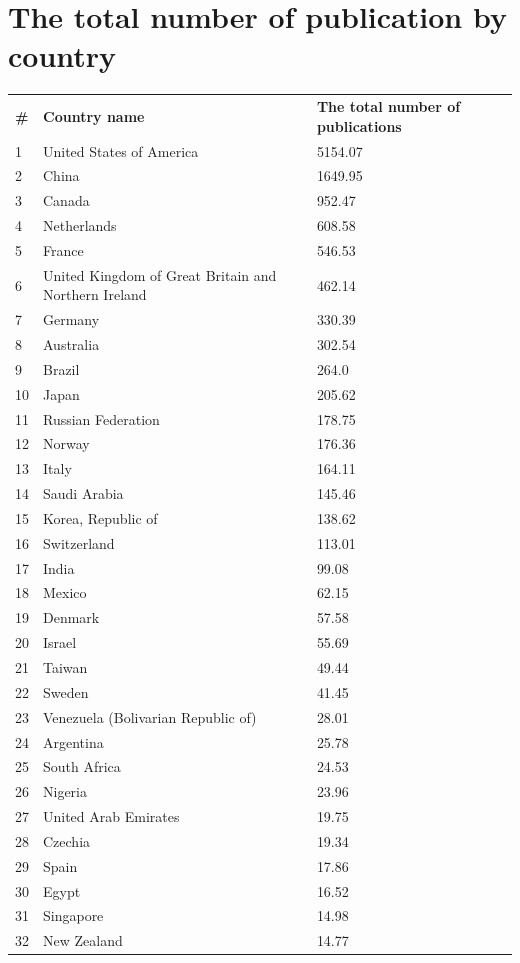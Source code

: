 \documentclass[energies,article,submit,moreauthors,pdftex]{Definitions/mdpi}
\begin{document}
\section{The total number of publication by country}
\begin{tabular}{@{}p{0.5cm}<{}@{}p{9cm}<{\dotfill}@{}p{\dimexpr\linewidth-4cm}@{}}
\textbf{\#} & \textbf{Country name} & \textbf{The total number of publications} \\
1 & United States of America & 5154.07\\
2 & China & 1649.95\\
3 & Canada & 952.47\\
4 & Netherlands & 608.58\\
5 & France & 546.53\\
6 & United Kingdom of Great Britain and Northern Ireland & 462.14\\
7 & Germany & 330.39\\
8 & Australia & 302.54\\
9 & Brazil & 264.0\\
10 & Japan & 205.62\\
11 & Russian Federation & 178.75\\
12 & Norway & 176.36\\
13 & Italy & 164.11\\
14 & Saudi Arabia & 145.46\\
15 & Korea, Republic of & 138.62\\
16 & Switzerland & 113.01\\
17 & India & 99.08\\
18 & Mexico & 62.15\\
19 & Denmark & 57.58\\
20 & Israel & 55.69\\
21 & Taiwan & 49.44\\
22 & Sweden & 41.45\\
23 & Venezuela (Bolivarian Republic of) & 28.01\\
24 & Argentina & 25.78\\
25 & South Africa & 24.53\\
26 & Nigeria & 23.96\\
27 & United Arab Emirates & 19.75\\
28 & Czechia & 19.34\\
29 & Spain & 17.86\\
30 & Egypt & 16.52\\
31 & Singapore & 14.98\\
32 & New Zealand & 14.77\\

\end{tabular}
\end{document}
